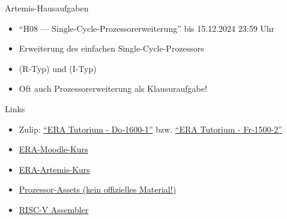 \begin{frame}[c, fragile]{Artemis-Hausaufgaben}{}
	\begin{itemize}
		\item \enquote{H08 --- Single-Cycle-Prozessorerweiterung} bis 15.12.2024 23:59 Uhr
		\item Erweiterung des einfachen Single-Cycle-Prozessors
		\item {} (R-Typ) und {} (I-Typ)
		\item Oft auch Prozessorerweiterung als Klausuraufgabe!
	\end{itemize}
\end{frame}

\begin{frame}[c, fragile]{Links}{}
	\begin{itemize}
		\item Zulip: \href{https://zulip.in.tum.de/#narrow/stream/2661-ERA-Tutorium---Do-1600-1}{\enquote{ERA Tutorium - Do-1600-1}}
		      bzw. \href{https://zulip.in.tum.de/#narrow/stream/2675-ERA-Tutorium---Fr-1500-2 }{\enquote{ERA Tutorium - Fr-1500-2}}
		\item \href{https://www.moodle.tum.de/course/view.php?id=100633}{ERA-Moodle-Kurs}
		\item \href{https://artemis.in.tum.de/courses/401}{ERA-Artemis-Kurs}
		\item \href{https://courses.edx.org/assets/courseware/v1/f06a2dc0c856f60ec0711e9f5e1c98cf/asset-v1:HarveyMuddX+ENGR85B+1T2023+type@asset+block/FinalReferences.pdf}{Prozessor-Assets (kein offizielles Material!)}
		\item \href{https://riscvasm.lucasteske.dev/}{RISC-V Assembler}
	\end{itemize}
\end{frame}

\maketitle


